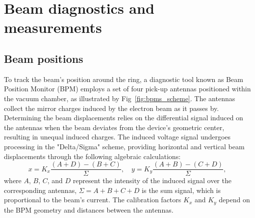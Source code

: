 



\section{Beam diagnostics and measurements}
\subsection{Beam positions}
To track the beam's position around the ring, a diagnostic tool known as Beam Position Monitor (BPM) employs a set of four pick-up antennas positioned within the vacuum chamber, as illustrated by Fig~\ref{fig:bpms_scheme}. The antennas collect the mirror charges induced by the electron beam as it passes by. Determining the beam displacements relies on the differential signal induced on the antennas when the beam deviates from the device's geometric center, resulting in unequal induced charges. The induced voltage signal undergoes processing in the "Delta/Sigma" scheme, providing horizontal and vertical beam displacements through the following algebraic calculations:
\begin{equation}
    x = K_x \frac{(A+D)-(B+C)}{\Sigma}, \quad y = K_y \frac{(A+B)-(C+D)}{\Sigma},
\end{equation}
where $A$, $B$, $C$, and $D$ represent the intensity of the induced signal over the corresponding antennas, $\Sigma = A + B + C + D$ is the sum signal, which is proportional to the beam's current. The calibration factors $K_x$ and $K_y$ depend on the BPM geometry and distances between the antennas.

